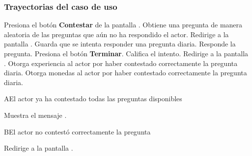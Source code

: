 \subsubsection{Trayectorias del caso de uso}

\begin{UCtrayectoria}%
%
    \Actor Presiona el botón {\bf Contestar} de la pantalla .
    \Sistema Obtiene una pregunta de manera aleatoria de las preguntas que aún no ha respondido el actor. 
    \Sistema Redirige a la pantalla .
    \Sistema Guarda que se intenta responder una pregunta diaria.
    \Actor Responde la pregunta.
    \Actor Presiona el botón {\bf Terminar}.
    \Sistema Califica el intento. 
    \Sistema Redirige a la pantalla .
    \Sistema Otorga experiencia al actor por haber contestado correctamente la pregunta diaria.
    \Sistema Otorga monedas al actor por haber contestado correctamente la pregunta diaria.
    

\end{UCtrayectoria}



\begin{UCtrayectoriaA}{A}{El actor ya ha contestado todas las preguntas disponibles}

  \Sistema Muestra el mensaje .

\end{UCtrayectoriaA}


\begin{UCtrayectoriaA}{B}{El actor no contestó correctamente la pregunta}

    \Sistema Redirige a la pantalla .

\end{UCtrayectoriaA}